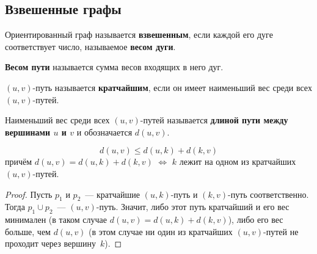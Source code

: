 \subsection{Взвешенные графы}
Ориентированный граф называется \textbf{взвешенным}, если каждой его дуге соответствует число, называемое \textbf{весом дуги}.

\textbf{Весом пути} называется сумма весов входящих в него дуг.

$(u, v)$-путь называется \textbf{кратчайшим}, если он имеет наименьший вес среди всех $(u, v)$-путей.

Наименьший вес среди всех $(u, v)$-путей называется \textbf{длиной пути между вершинами $u$ и $v$} и обозначается $d(u, v)$.

\begin{statement}
\begin{equation*}
d(u, v) \leqslant d(u, k) + d(k, v)
\end{equation*}
причём $d(u, v) = d(u, k) + d(k, v)$ $\Leftrightarrow$ $k$ лежит на одном из кратчайших $(u, v)$-путей.
\end{statement}
\begin{proof}
Пусть $p_1$ и $p_2$~--- кратчайшие $(u, k)$-путь и $(k, v)$-путь соответственно.
Тогда $p_1 \cup p_2$~--- $(u, v)$-путь.
Значит, либо этот путь кратчайший и его вес минимален (в таком случае $d(u, v) = d(u, k) + d(k, v)$), либо его вес больше, чем $d(u, v)$ (в этом случае ни один из кратчайших $(u, v)$-путей не проходит через вершину~$k$).
\end{proof}